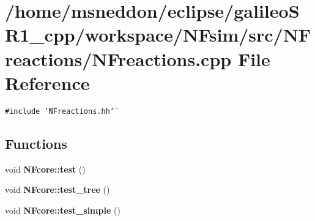 \section{/home/msneddon/eclipse/galileoSR1\_\-cpp/workspace/NFsim/src/NFreactions/NFreactions.cpp File Reference}
\label{NFreactions_8cpp}


{\tt \#include \char`\"{}NFreactions.hh\char`\"{}}\par
\subsection*{Functions}
\begin{CompactItemize}
\item 
void {\bf NFcore::test} ()
\item 
void {\bf NFcore::test\_\-tree} ()
\item 
void {\bf NFcore::test\_\-simple} ()
\end{CompactItemize}
